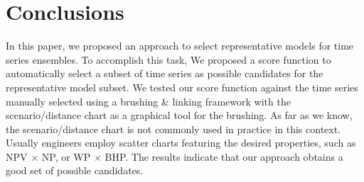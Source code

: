 \documentclass[final,5p,times,twocolumn]{elsarticle}
\begin{document}





\section{Conclusions}
\label{sec:conclusion}

In this paper, we proposed an approach to select representative models for time series ensembles. To accomplish this task, We proposed a score function to automatically select a subset of time series as possible candidates for the representative model subset. We tested our score function against the time series manually selected using a brushing \& linking framework with the scenario/distance chart as a graphical tool for the brushing. As far as we know, the scenario/distance chart is not commonly used in practice in this context. Usually engineers employ scatter charts featuring the desired properties, such as NPV $\times$ NP, or WP $\times$ BHP. The results indicate that our approach obtains a good set of possible candidates.
\end{document}
